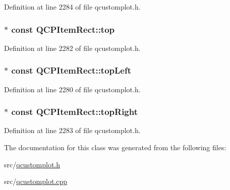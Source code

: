 Definition at line 2284 of file qcustomplot.\-h.

\hypertarget{class_q_c_p_item_rect_a96e50db552fb297d6fb62614676217bc}{
\subsubsection[{top}]{$\ast$ const Q\-C\-P\-Item\-Rect\-::top}}\label{class_q_c_p_item_rect_a96e50db552fb297d6fb62614676217bc}


Definition at line 2282 of file qcustomplot.\-h.

\hypertarget{class_q_c_p_item_rect_aa70feeef173489b03c3fbe906a5023c4}{
\subsubsection[{top\-Left}]{$\ast$ const Q\-C\-P\-Item\-Rect\-::top\-Left}}\label{class_q_c_p_item_rect_aa70feeef173489b03c3fbe906a5023c4}


Definition at line 2280 of file qcustomplot.\-h.

\hypertarget{class_q_c_p_item_rect_a77e0eb6e4aa6efee620d35e2c21bdad7}{
\subsubsection[{top\-Right}]{$\ast$ const Q\-C\-P\-Item\-Rect\-::top\-Right}}\label{class_q_c_p_item_rect_a77e0eb6e4aa6efee620d35e2c21bdad7}


Definition at line 2283 of file qcustomplot.\-h.



The documentation for this class was generated from the following files\-:\begin{DoxyCompactItemize}
\item 
src/\hyperlink{qcustomplot_8h}{qcustomplot.\-h}\item 
src/\hyperlink{qcustomplot_8cpp}{qcustomplot.\-cpp}\end{DoxyCompactItemize}
